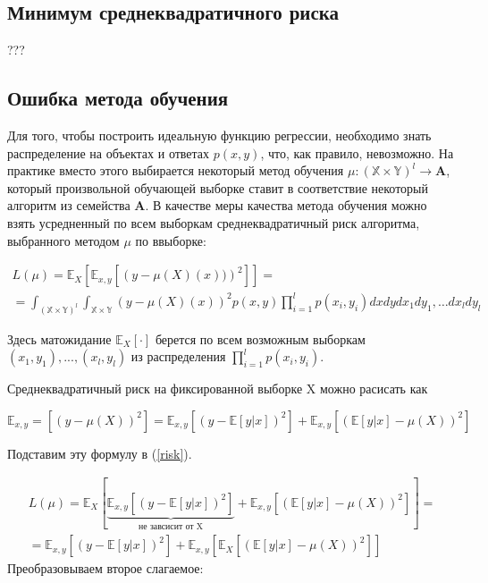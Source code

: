\documentclass{article}
\begin{document}
\subsection{Минимум среднеквадратичного риска}

???

\subsection{Ошибка метода обучения}

Для того, чтобы построить идеальную функцию регрессии, необходимо знать распределение на объектах и ответах $p(x, y)$, что, как правило, невозможно. На практике вместо этого выбирается некоторый метод обучения $\mu : (\mathbb{X}\times\mathbb{Y})^l \rightarrow \mathbf{A}$, который произвольной обучающей выборке ставит в соответствие некоторый алгоритм из семейства $\mathbf{A}$. В качестве меры качества метода обучения можно взять усредненный
по всем выборкам среднеквадратичный риск алгоритма, выбранного методом $\mu$ по ввыборке:

\begin{multline}
	L(\mu) = \mathbb{E}_X\left[\mathbb{E}_{x,y}\left[ \left(y-\mu(X)(x))\right)^2\right]\right] =  \\ =\int_{(\mathbb{X}\times\mathbb{Y})^l}\int_{\mathbb{X}\times\mathbb{Y}} \left(y-\mu(X)(x)\right)^2 p(x,y)\prod^l_{i=1}p(x_i,y_i)dxdydx_1dy_1,\ldots dx_ldy_l
	\label{risk}
\end{multline}

Здесь матожидание $\mathbb{E}_X[\cdot]$ берется по всем возможным выборкам ${(x_1, y_1), . . . ,(x_l, y_l)}$
из распределения $\prod_{i=1}^{l}p(x_i,y_i)$.

Среднеквадратичный риск на фиксированной выборке X можно расисать как

$\mathbb{E}_{x,y} = \left[(y-\mu(X))^2\right] = \mathbb{E}_{x,y}\left[(y-\mathbb{E}[y|x])^2\right] + \mathbb{E}_{x,y}\left[(\mathbb{E}[y|x] - \mu(X))^2\right]$

Подставим эту формулу в (\ref{risk}).

\begin{equation}
	\begin{split}
	L(\mu) = \mathbb{E}_X\left[\underbrace{\mathbb{E}_{x,y}\left[(y-\mathbb{E}[y|x])^2\right]}_{\text{не завсисит от X}} + \mathbb{E}_{x,y}\left[(\mathbb{E}[y|x] - \mu(X))^2\right]\right] = \\
	= \mathbb{E}_{x,y}\left[(y-\mathbb{E}[y|x])^2\right] + \mathbb{E}_{x,y}\left[\mathbb{E}_X \left[(\mathbb{E}[y|x]- \mu(X))^2\right]\right]
\end{split}
\label{2.2}
\end{equation}
Преобразовываем второе слагаемое:
\end{document}
